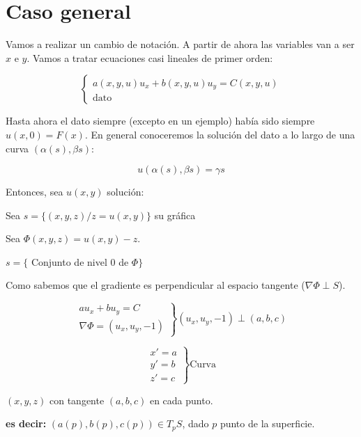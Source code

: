 \section{Caso general}

	Vamos a realizar un cambio de notación. A partir de ahora las variables van a ser $x$ e $y$. Vamos a tratar ecuaciones casi lineales de primer orden:

	\begin{equation*}
		\left\{
			\begin{array}{l}
			a(x,y,u)u_x + b(x,y,u)u_y = C(x,y,u) \\
			\text{dato}
			\end{array}
		\right.
	\end{equation*}

	Hasta ahora el dato siempre (excepto en un ejemplo)%
	había sido siempre $u(x,0) = F(x)$. En general conoceremos la solución del dato a lo largo de una curva $(\alpha(s),\beta{s})$:

	$$ u(\alpha(s),\beta{s}) = \gamma{s} $$

	Entonces, sea $u(x,y)$ solución:

	Sea $s = \{(x,y,z) / z = u(x,y)\}$ su gráfica

	Sea $\Phi(x,y,z) = u(x,y) - z$.

	$s = \{$ Conjunto de nivel 0 de $ \Phi \}$

	Como sabemos que el gradiente es perpendicular al espacio tangente ($\nabla \Phi \perp S$).

	\begin{equation*}
		\left.
		\begin{array}{rl}
			au_x + bu_y = C \\
			\nabla \Phi = (u_x, u_y, -1)
		\end{array}
		\right\} (u_x,u_y, -1) \perp (a,b,c)
	\end{equation*}

	\begin{equation*}
		\left.
		\begin{array}{rl}
			x' = a \\
			y' = b \\
			z' = c
		\end{array}
		\right\} \text{Curva}
	\end{equation*}

	$(x,y,z)$ con tangente $(a,b,c)$ en cada punto.

	\textbf{es decir:} $(a(p),b(p),c(p)) \in T_pS$, dado $p$ punto de la superficie.


